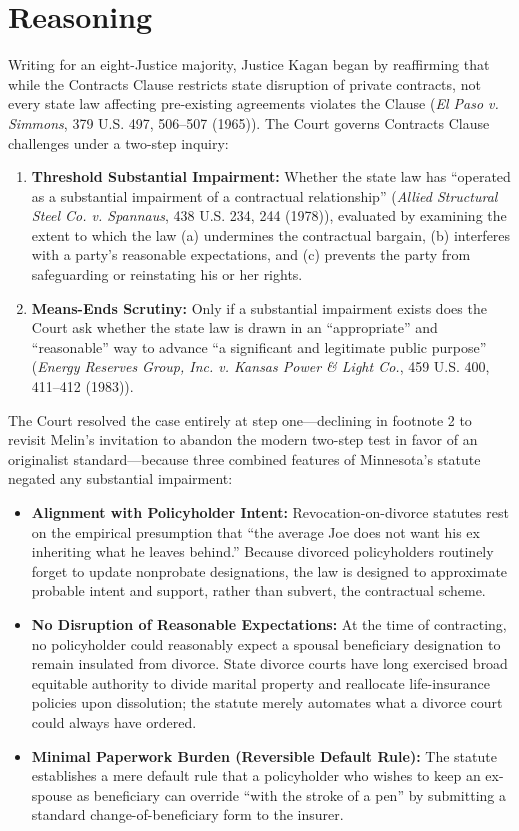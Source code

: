 \documentclass[12pt]{article}
\begin{document}
\section{Reasoning}
Writing for an eight-Justice majority, Justice Kagan began by reaffirming that while the Contracts Clause restricts state disruption of private contracts, not every state law affecting pre-existing agreements violates the Clause (\textit{El Paso v. Simmons}, 379 U.S. 497, 506--507 (1965)). The Court governs Contracts Clause challenges under a two-step inquiry:
\begin{enumerate}
  \item \textbf{Threshold Substantial Impairment:} Whether the state law has ``operated as a substantial impairment of a contractual relationship'' (\textit{Allied Structural Steel Co. v. Spannaus}, 438 U.S. 234, 244 (1978)), evaluated by examining the extent to which the law (a) undermines the contractual bargain, (b) interferes with a party's reasonable expectations, and (c) prevents the party from safeguarding or reinstating his or her rights.
  \item \textbf{Means-Ends Scrutiny:} Only if a substantial impairment exists does the Court ask whether the state law is drawn in an ``appropriate'' and ``reasonable'' way to advance ``a significant and legitimate public purpose'' (\textit{Energy Reserves Group, Inc. v. Kansas Power \& Light Co.}, 459 U.S. 400, 411--412 (1983)).
\end{enumerate}

The Court resolved the case entirely at step one---declining in footnote 2 to revisit Melin's invitation to abandon the modern two-step test in favor of an originalist standard---because three combined features of Minnesota's statute negated any substantial impairment:
\begin{itemize}
  \item \textbf{Alignment with Policyholder Intent:} Revocation-on-divorce statutes rest on the empirical presumption that ``the average Joe does not want his ex inheriting what he leaves behind.'' Because divorced policyholders routinely forget to update nonprobate designations, the law is designed to approximate probable intent and support, rather than subvert, the contractual scheme.
  \item \textbf{No Disruption of Reasonable Expectations:} At the time of contracting, no policyholder could reasonably expect a spousal beneficiary designation to remain insulated from divorce. State divorce courts have long exercised broad equitable authority to divide marital property and reallocate life-insurance policies upon dissolution; the statute merely automates what a divorce court could always have ordered.
  \item \textbf{Minimal Paperwork Burden (Reversible Default Rule):} The statute establishes a mere default rule that a policyholder who wishes to keep an ex-spouse as beneficiary can override ``with the stroke of a pen'' by submitting a standard change-of-beneficiary form to the insurer.
\end{itemize}
\end{document}
